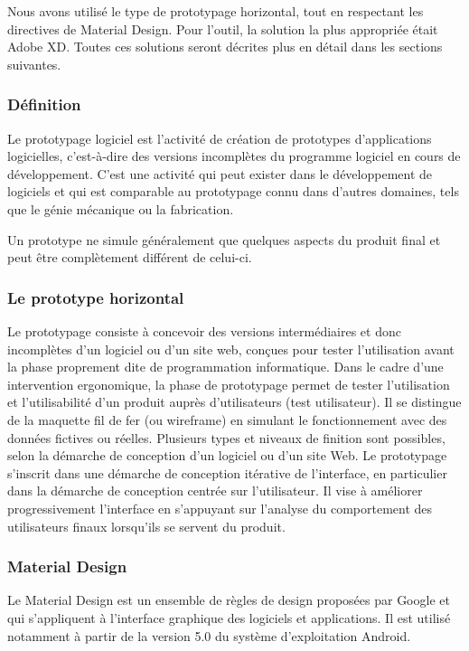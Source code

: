 Nous avons utilisé le type de prototypage horizontal, tout en respectant les directives de Material Design. Pour l'outil, la solution la plus appropriée était Adobe XD. Toutes ces solutions seront décrites plus en détail dans les sections suivantes.

\subsubsection{Définition}
Le prototypage logiciel est l’activité de création de prototypes d’applications logicielles, c’est-à-dire des versions incomplètes du programme logiciel en cours de développement. C’est une activité qui peut exister dans le développement de logiciels et qui est comparable au prototypage connu dans d’autres domaines, tels que le génie mécanique ou la fabrication.

Un prototype ne simule généralement que quelques aspects du produit final et peut être complètement différent de celui-ci\cite{noauthor_software_nodate}.

\subsubsection{Le prototype horizontal}
Le prototypage consiste à concevoir des versions intermédiaires et donc incomplètes d'un logiciel ou d'un site web, conçues pour tester l'utilisation avant la phase proprement dite de programmation informatique. Dans le cadre d'une intervention ergonomique, la phase de prototypage permet de tester l'utilisation et l'utilisabilité d'un produit auprès d'utilisateurs (test utilisateur). Il se distingue de la maquette fil de fer (ou wireframe) en simulant le fonctionnement avec des données fictives ou réelles. Plusieurs types et niveaux de finition sont possibles, selon la démarche de conception d'un logiciel ou d'un site Web. Le prototypage s’inscrit dans une démarche de conception itérative de l’interface, en particulier dans la démarche de conception centrée sur l'utilisateur. Il vise à améliorer progressivement l’interface en s’appuyant sur l’analyse du comportement des utilisateurs finaux lorsqu'ils se servent du produit\cite{noauthor_prototypage_nodate}.

\subsubsection{Material Design}

Le Material Design est un ensemble de règles de design proposées par Google et qui s'appliquent à l'interface graphique des logiciels et applications. Il est utilisé notamment à partir de la version 5.0 du système d'exploitation Android.

